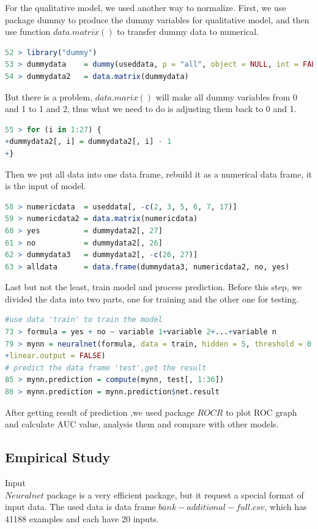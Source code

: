 \documentclass[12pt, a4paper, bibliography=totoc, english]{scrartcl}
\begin{document}
For the qualitative model, we used another way to normalize. First, we use package dummy to produce the dummy variables for qualitative model, and then use function $data.matrix()$ to transfer dummy data to numerical. 
\begin{lstlisting}[language = R]
52 > library("dummy")
53 > dummydata    = dummy(useddata, p = "all", object = NULL, int = FALSE, verbose = FALSE)
54 > dummydata2   = data.matrix(dummydata)
\end{lstlisting}

But there is a problem, $data.marix()$ will make all dummy variables from 0 and 1 to 1 and 2, thus what we need to do is adjusting them back to 0 and 1.
\begin{lstlisting}[language = R]
55 > for (i in 1:27) {
+dummydata2[, i] = dummydata2[, i] - 1
+}
\end{lstlisting}

Then we put all data into one data frame, rebuild it as a numerical data frame, it is the input of model.
\begin{lstlisting}[language = R]
58 > numericdata  = useddata[, -c(2, 3, 5, 6, 7, 17)]
59 > numericdata2 = data.matrix(numericdata)
60 > yes          = dummydata2[, 27]
61 > no           = dummydata2[, 26]
62 > dummydata3   = dummydata2[, -c(26, 27)]
63 > alldata      = data.frame(dummydata3, numericdata2, no, yes)
\end{lstlisting}

Last but not the least, train model and process prediction. Before this step, we divided the data into two parts, one for training and the other one for testing.

\begin{lstlisting}[language = R]
#use data 'train' to train the model 
73 > formula = yes + no ~ variable 1+variable 2+...+variable n
79 > mynn = neuralnet(formula, data = train, hidden = 5, threshold = 0.01, act.fct = "logistic", 
+linear.output = FALSE)
# predict the data frame 'test',get the result
85 > mynn.prediction = compute(mynn, test[, 1:36])
86 > mynn.prediction = mynn.prediction$net.result
\end{lstlisting}

After getting result of prediction ,we used package $ROCR$ to plot ROC graph and calculate AUC value, analysis them and compare with other models.

\subsection{Empirical Study}\label{NNES}
\textbullet\quad Input\\
$Neuralnet$ package is a very efficient package, but it request a special format of input data. The used data is data frame $bank-additional-full.csv$, which has 41188 examples and each have 20 inputs.
\end{document}
